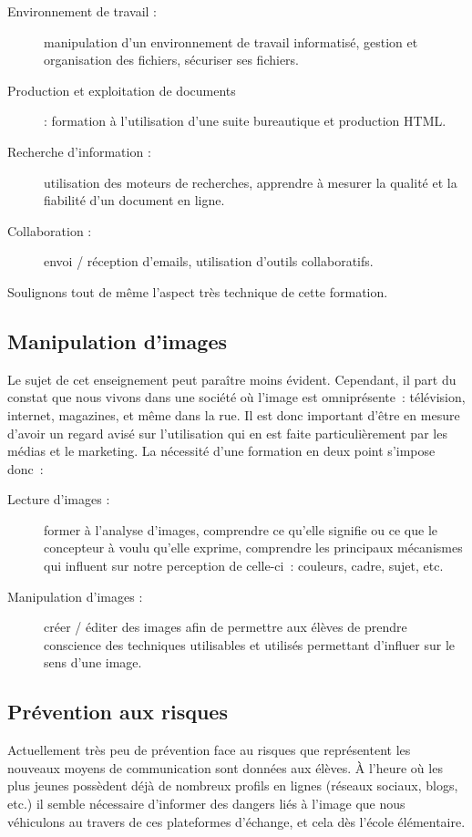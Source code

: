 \begin{description}
  \item[Environnement de travail :] manipulation d'un environnement de travail informatisé, gestion et organisation des fichiers, sécuriser ses fichiers.
  \item[Production et exploitation de documents] : formation à l'utilisation d'une suite bureautique et production HTML.
  \item[Recherche d'information :] utilisation des moteurs de recherches, apprendre à mesurer la qualité et la fiabilité d'un document en ligne.
  \item[Collaboration :] envoi / réception d'emails, utilisation d'outils collaboratifs.
\end{description}

Soulignons tout de même l'aspect très technique de cette formation.

\subsection{Manipulation d'images}
Le sujet de cet enseignement peut paraître moins évident. Cependant,
il part du constat que nous vivons dans une société où l'image est
omniprésente~: télévision, internet, magazines, et même dans la
rue. Il est donc important d'être en mesure d'avoir un regard avisé
sur l'utilisation qui en est faite particulièrement par les médias et
le marketing. La nécessité d'une formation en deux point s'impose donc~:

\begin{description}
  \item[Lecture d'images :] former à l'analyse d'images, comprendre ce
    qu'elle signifie ou ce que le concepteur à voulu qu'elle exprime,
    comprendre les principaux mécanismes qui influent sur notre
    perception de celle-ci~: couleurs, cadre, sujet, etc.
  \item[Manipulation d'images :] créer / éditer des images afin de
    permettre aux élèves de prendre conscience des techniques
    utilisables et utilisés permettant d'influer sur le sens d'une image.
\end{description}

\subsection{Prévention aux risques}
Actuellement très peu de prévention face au risques que représentent
les nouveaux moyens de communication sont données aux élèves. À
l'heure où les plus jeunes possèdent déjà de nombreux profils en
lignes (réseaux sociaux, blogs, etc.) il semble nécessaire d'informer
des dangers liés à l'image que nous véhiculons au travers de ces
plateformes d'échange, et cela dès l'école élémentaire.

